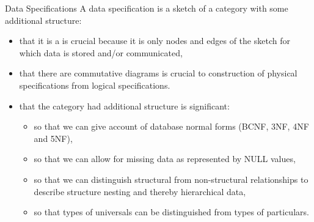 \begin{frame}{Data Specifications}
A data specification is a sketch of a category with some additional structure:
\begin{itemize}
\item that it is a  is crucial because it is only nodes and edges of the sketch for which data is stored and/or communicated, 
\item that there are commutative diagrams is crucial to construction of physical 
specifications from logical specifications.
\item that the category had additional structure is significant:
\begin{itemize}
\item so that we can give account of database normal forms 
(BCNF, 3NF, 4NF and 5NF),
\item so that we can allow for missing data as represented by NULL values, 
\item so that we can distinguish structural from non-structural relationships to describe structure nesting and thereby hierarchical data,
\item so that types of universals can be distinguished from types of particulars.
\end{itemize}
\end{itemize}
\end{frame}



\iffalse
\begin{frame}{Database Normal Forms}
\begin{itemize}
\item presentations (sketches) should be minimal and avoid redundancy:
\item how to make this precise?
\item in case of relational data model leads to 
   \begin{itemize}
     \item third normal form (3NF)
     \item Boyce-Codd normal form (BCNF)
     \item fourth normal form (4NF)
     \item fifth normal form (5NF)
   \end{itemize}
\end{itemize}
\end{frame}
\fi

